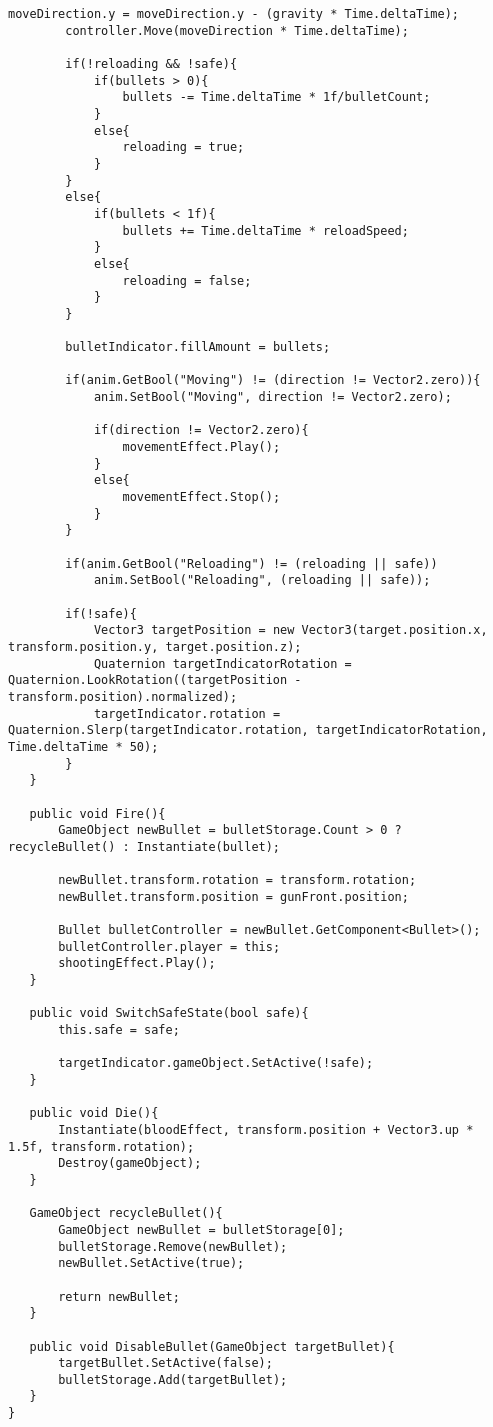 \begin{lstlisting}[language=Csh]
        moveDirection.y = moveDirection.y - (gravity * Time.deltaTime);
        controller.Move(moveDirection * Time.deltaTime);
		
		if(!reloading && !safe){
			if(bullets > 0){
				bullets -= Time.deltaTime * 1f/bulletCount;
			}
			else{
				reloading = true;
			}
		}
		else{
			if(bullets < 1f){
				bullets += Time.deltaTime * reloadSpeed;
			}
			else{
				reloading = false;
			}
		}
		
		bulletIndicator.fillAmount = bullets;
		
		if(anim.GetBool("Moving") != (direction != Vector2.zero)){
			anim.SetBool("Moving", direction != Vector2.zero);
			
			if(direction != Vector2.zero){
				movementEffect.Play();
			}
			else{
				movementEffect.Stop();
			}
		}
		
		if(anim.GetBool("Reloading") != (reloading || safe))
			anim.SetBool("Reloading", (reloading || safe));
		
		if(!safe){
			Vector3 targetPosition = new Vector3(target.position.x, transform.position.y, target.position.z);
			Quaternion targetIndicatorRotation = Quaternion.LookRotation((targetPosition - transform.position).normalized);
			targetIndicator.rotation = Quaternion.Slerp(targetIndicator.rotation, targetIndicatorRotation, Time.deltaTime * 50);
		}	
   }
   
   public void Fire(){
	   GameObject newBullet = bulletStorage.Count > 0 ? recycleBullet() : Instantiate(bullet);
	   
	   newBullet.transform.rotation = transform.rotation;
	   newBullet.transform.position = gunFront.position;
	   
	   Bullet bulletController = newBullet.GetComponent<Bullet>();
	   bulletController.player = this;
	   shootingEffect.Play();
   }
   
   public void SwitchSafeState(bool safe){
	   this.safe = safe;
	   
	   targetIndicator.gameObject.SetActive(!safe);
   }
   
   public void Die(){
	   Instantiate(bloodEffect, transform.position + Vector3.up * 1.5f, transform.rotation);
	   Destroy(gameObject);
   }
   
   GameObject recycleBullet(){
	   GameObject newBullet = bulletStorage[0];
	   bulletStorage.Remove(newBullet);
	   newBullet.SetActive(true);
	   
	   return newBullet;
   }
   
   public void DisableBullet(GameObject targetBullet){
	   targetBullet.SetActive(false);
	   bulletStorage.Add(targetBullet);
   }
}


\end{lstlisting}
